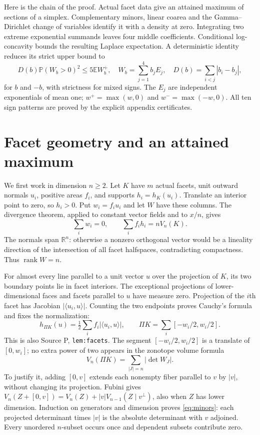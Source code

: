 \documentclass[11pt]{article}
\theoremstyle{remark}\newtheorem{remark}[theorem]{Remark}
\newcommand{\R}{\mathbb R}
\newcommand{\E}{\mathbb E}
\newcommand{\Prob}{\mathbb P}
\DeclareMathOperator{\rank}{rank}
\numberwithin{equation}{section}
\begin{document}
Here is the chain of the proof. Actual facet data give an attained
maximum of sections of a simplex. Complementary minors, linear coarea
and the Gamma--Dirichlet change of variables identify it with a density
at zero. Integrating two extreme exponential summands leaves four middle
coefficients. Conditional log-concavity bounds the resulting Laplace
expectation. A deterministic identity reduces its strict upper bound to
\begin{equation}\label{eq:S4}
 D(b)\Prob(W_b>0)^2\le5\E W_b^+,
 \quad W_b=\sum_{j=1}^4 b_jE_j,\quad
 D(b)=\sum_{i<j}|b_i-b_j|,
\end{equation}
for $b$ and $-b$, with strictness for mixed signs. The $E_j$ are independent
exponentials of mean one; $w^+=\max(w,0)$ and $w^-=\max(-w,0)$.
All ten sign patterns are proved by the explicit appendix certificates.

\section{Facet geometry and an attained maximum}\label{sec:geometry}
We first work in dimension $n\ge2$. Let $K$ have $m$ actual facets,
unit outward normals $u_i$, positive areas $f_i$, and supports
$h_i=h_K(u_i)$. Translate an interior point to zero, so $h_i>0$.
Put $w_i=f_i u_i$ and let $W$ have these columns. The divergence theorem,
applied to constant vector fields and to $x/n$, gives
\begin{equation}\label{eq:balance}
 \sum_i w_i=0,\qquad \sum_i f_i h_i=nV_n(K).
\end{equation}
The normals span $\R^n$: otherwise a nonzero orthogonal vector would be
a lineality direction of the intersection of all facet halfspaces,
contradicting compactness. Thus $\rank W=n$.

For almost every line parallel to a unit vector $u$ over the projection
of $K$, its two boundary points lie in facet interiors. The exceptional
projections of lower-dimensional faces and facets parallel to $u$ have
measure zero. Projection of the $i$th facet has Jacobian
$|\langle u_i,u\rangle|$. Counting the two endpoints proves Cauchy's formula
and fixes the normalization:
\begin{equation}\label{eq:zonotope}
 h_{\Pi K}(u)=\tfrac12\sum_i f_i|\langle u_i,u\rangle|,
 \qquad \Pi K=\sum_i[-w_i/2,w_i/2].
\end{equation}
This is also Source P, \texttt{lem:facets}.
The segment $[-w_i/2,w_i/2]$ is a translate of $[0,w_i]$; no extra power
of two appears in the zonotope volume formula
\begin{equation}\label{eq:minors}
 V_n(\Pi K)=\sum_{|J|=n}|\det W_J|.
\end{equation}
To justify it, adding $[0,v]$ extends each nonempty fiber parallel to
$v$ by $|v|$, without changing its projection. Fubini gives
$V_n(Z+[0,v])=V_n(Z)+|v|V_{n-1}(Z\mid v^\perp)$, also when $Z$ has
lower dimension. Induction on generators and dimension proves
\eqref{eq:minors}: each projected determinant times $|v|$ is the
absolute determinant with $v$ adjoined. Every unordered $n$-subset
occurs once and dependent subsets contribute zero.
\end{document}
